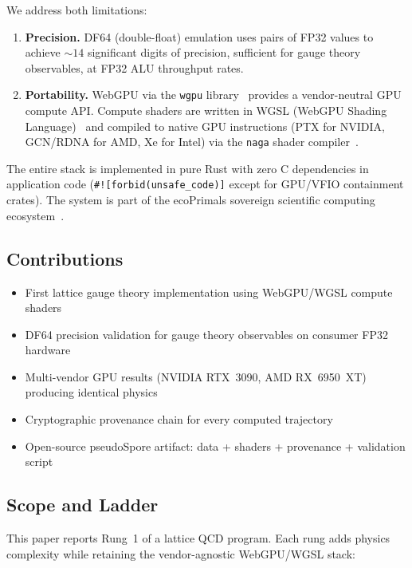 \documentclass[aps,prl,twocolumn,superscriptaddress,showpacs]{revtex4-2}
\begin{document}
We address both limitations:

\begin{enumerate}
\item \textbf{Precision.} DF64 (double-float) emulation uses pairs of
  FP32 values to achieve ${\sim}14$ significant digits of precision,
  sufficient for gauge theory observables, at FP32 ALU throughput rates.

\item \textbf{Portability.} WebGPU via the \texttt{wgpu}
  library~\cite{wgpu} provides a vendor-neutral GPU compute API.
  Compute shaders are written in WGSL (WebGPU Shading Language)~\cite{wgsl}
  and compiled to native GPU instructions (PTX for NVIDIA, GCN/RDNA for
  AMD, Xe for Intel) via the \texttt{naga} shader compiler~\cite{naga}.
\end{enumerate}

The entire stack is implemented in pure Rust with zero C dependencies in
application code (\verb|#![forbid(unsafe_code)]| except for GPU/VFIO
containment crates). The system is part of the ecoPrimals sovereign
scientific computing ecosystem~\cite{ecoprimals}.

\subsection{Contributions}

\begin{itemize}
\item First lattice gauge theory implementation using WebGPU/WGSL
  compute shaders
\item DF64 precision validation for gauge theory observables on consumer
  FP32 hardware
\item Multi-vendor GPU results (NVIDIA RTX~3090, AMD RX~6950~XT)
  producing identical physics
\item Cryptographic provenance chain for every computed trajectory
\item Open-source pseudoSpore artifact: data + shaders + provenance +
  validation script
\end{itemize}

\subsection{Scope and Ladder}

This paper reports Rung~1 of a lattice QCD program. Each rung adds
physics complexity while retaining the vendor-agnostic WebGPU/WGSL
stack:
\end{document}
